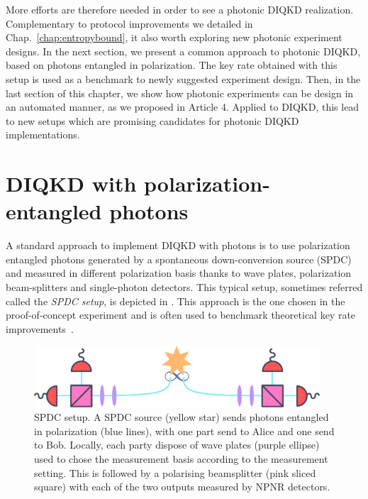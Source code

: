 \medbreak

More efforts are therefore needed in order to see a photonic DIQKD realization. 
Complementary to protocol improvements we detailed in Chap.~\ref{chap:entropybound}, it also worth exploring new photonic experiment designs.
In the next section, we present a common approach to photonic DIQKD, based on photons entangled in polarization.
The key rate obtained with this setup is used as a benchmark to newly suggested experiment design.
Then, in the last section of this chapter, we show how photonic experiments can be design in an automated manner, as we proposed in Article 4.
Applied to DIQKD, this lead to new setups which are promising candidates for photonic DIQKD implementations.


\section{DIQKD with polarization-entangled photons}
\label{sec:PolarizationDIQKD}

A standard approach to implement DIQKD with photons is to use polarization entangled photons generated by a spontaneous down-conversion source (SPDC) and measured in different polarization basis thanks to wave plates, polarization beam-splitters and single-photon detectors.
This typical setup, sometimes referred called the \textit{SPDC setup}, is depicted in .
This approach is the one chosen in the proof-of-concept experiment \cite{Liu2022} and is often used to benchmark theoretical key rate improvements~\cite{Ho2020,Sekatski2021}.

\begin{figure}[t]
	\begin{center}
		\includegraphics[width=0.95\textwidth]{chapters/deviceindependent/img/spdc.pdf}
	\end{center}
	\caption{SPDC setup. A SPDC source (yellow star) sends photons entangled in polarization (blue lines), with one part send to Alice and one send to Bob.
	Locally, each party dispose of wave plates (purple ellipse) used to chose the measurement basis according to the measurement setting. This is followed by a polarising beamsplitter (pink sliced square) with each of the two outputs measured by NPNR detectors.}
	\label{fig:spdc}
\end{figure}

